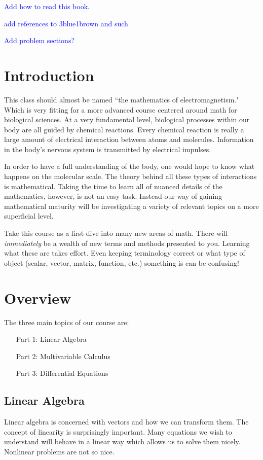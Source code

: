 
    \textcolor{blue}{Add how to read this book.} 
    
    \textcolor{blue}{add references to 3blue1brown and such}
    
    \textcolor{blue}{Add problem sections?}
    
    \section{Introduction}
    
    This class should almost be named ``the mathematics of electromagnetism."  Which is very fitting for a more advanced course centered around math for biological sciences. At a very fundamental level, biological processes within our body are all guided by chemical reactions.  Every chemical reaction is really a large amount of electrical interaction between atoms and molecules. Information in the body's nervous system is transmitted by electrical impulses.
    
    In order to have a full understanding of the body, one would hope to know what happens on the molecular scale. The theory behind all these types of interactions is mathematical.  Taking the time to learn all of nuanced details of the mathematics, however, is not an easy task. Instead our way of gaining mathematical maturity will be investigating a variety of relevant topics on a more superficial level.
    
    Take this course as a first dive into many new areas of math.  There will \emph{immediately} be a wealth of new terms and methods presented to you.  Learning what these are takes effort.  Even keeping terminology correct or what type of object (scalar, vector, matrix, function, etc.) something is can be confusing! 
    
    
    \section{Overview}
    The three main topics of our course are:
    \begin{itemize}
        \item[Part 1:] Linear Algebra
        \item[Part 2:] Multivariable Calculus
        \item[Part 3:] Differential Equations
    \end{itemize}
    
    
    \subsection{Linear Algebra}
    Linear algebra  is concerned with vectors and how we can transform them.  The concept of linearity is surprisingly important.  Many equations we wish to understand will behave in a linear way which allows us to solve them nicely.  Nonlinear problems are not so nice.  
    
